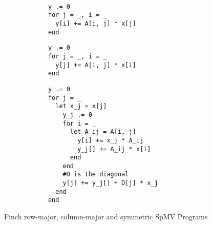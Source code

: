 \begin{wrapfigure}{r}{0.41\linewidth}
    \vspace{-36pt}
    \begin{minipage}[t]{0.18\textwidth}
        \begin{verbatim}
        
            y .= 0
            for j = _, i = _
              y[i] += A[i, j] * x[j]
            end
        \end{verbatim}
        \vspace{24pt} %
        \begin{verbatim}
            y .= 0
            for j = _, i = _
              y[j] += A[i, j] * x[i]
            end
        \end{verbatim}
    \end{minipage}\hfill%
    \begin{minipage}[t]{0.22\textwidth}
        \vspace{0pt} %
        \begin{verbatim}
            y .= 0
            for j = _
              let x_j = x[j]
                y_j .= 0
                for i = _
                  let A_ij = A[i, j]
                    y[i] += x_j * A_ij
                    y_j[] += A_ij * x[i]
                  end
                end
                #D is the diagonal
                y[j] += y_j[] + D[j] * x_j
              end
            end
        \end{verbatim}
    \end{minipage}
    \vspace{-12pt}
    \caption{Finch row-major, column-major and symmetric SpMV Programs}
    \label{spmv_programs}
    \vspace{-12pt}
  \end{wrapfigure}
